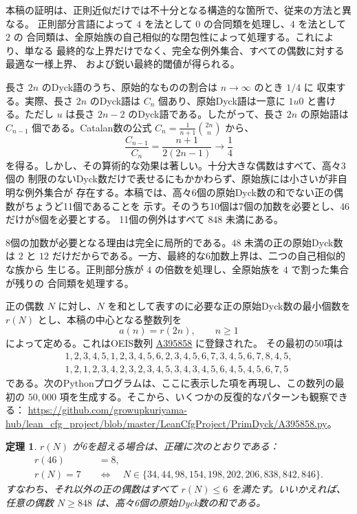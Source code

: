 \documentclass[12pt]{ltjsarticle}
\theoremstyle{plain}
\newtheorem{theorem}{定理}
\newcommand{\seqnum}[1]{\href{https://oeis.org/#1}{\rm \underline{#1}}}
\begin{document}
本稿の証明は、正則近似だけでは不十分となる構造的な箇所で、従来の方法と異なる。
正則部分言語によって $4$ を法として $0$ の合同類を処理し、$4$ を法として $2$ の
合同類は、全原始族の自己相似的な閉包性によって処理する。これにより、単なる
最終的な上界だけでなく、完全な例外集合、すべての偶数に対する最適な一様上界、
および鋭い最終的閾値が得られる。

長さ $2n$ のDyck語のうち、原始的なものの割合は $n\to\infty$ のとき $1/4$ に
収束する。実際、長さ $2n$ のDyck語は $C_n$ 個あり、原始Dyck語は一意に
$1u0$ と書ける。ただし $u$ は長さ $2n-2$ のDyck語である。したがって、長さ
$2n$ の原始語は $C_{n-1}$ 個である。Catalan数の公式
$C_n=\frac1{n+1}\binom{2n}{n}$ から、
\[
 \frac{C_{n-1}}{C_n}=\frac{n+1}{2(2n-1)}\longrightarrow\frac14
\]
を得る。しかし、その算術的な効果は著しい。十分大きな偶数はすべて、高々3個の
制限のないDyck数だけで表せるにもかかわらず、原始族には小さいが非自明な例外集合が
存在する。本稿では、高々6個の原始Dyck数の和でない正の偶数がちょうど11個であることを
示す。そのうち10個は7個の加数を必要とし、$46$だけが8個を必要とする。
11個の例外はすべて $848$ 未満にある。

8個の加数が必要となる理由は完全に局所的である。$48$ 未満の正の原始Dyck数は
$2$ と $12$ だけだからである。一方、最終的な6加数上界は、二つの自己相似的な族から
生じる。正則部分族が $4$ の倍数を処理し、全原始族を $4$ で割った集合が残りの
合同類を処理する。

正の偶数 $N$ に対し、$N$ を和として表すのに必要な正の原始Dyck数の最小個数を
$r(N)$ とし、本稿の中心となる整数列を
\[
        a(n)=r(2n),\qquad n\geq1
\]
によって定める。これはOEIS数列 \seqnum{A395858} \cite{OEIS-A395858} に登録された。
その最初の50項は
\[
\begin{gathered}
1,2,3,4,5,1,2,3,4,5,6,2,3,4,5,6,7,3,4,5,6,7,8,4,5,\\
1,2,1,2,3,4,2,3,2,3,4,5,3,4,3,4,5,6,4,5,4,5,6,7,5
\end{gathered}
\]
である。次のPythonプログラムは、ここに表示した項を再現し、この数列の最初の
$50{,}000$ 項を生成する。そこから、いくつかの反復的なパターンも観察できる：
\url{https://github.com/growupkuriyama-hub/lean_cfg_project/blob/master/LeanCfgProject/PrimDyck/A395858.py}。

\begin{theorem}\label{thm:main}
$r(N)$ が6を超える場合は、正確に次のとおりである：
\[
\begin{aligned}
r(46) &= 8, \\[4pt]
r(N) = 7 \quad&\Longleftrightarrow\quad
 N\in\{34,44,98,154,198,202,206,838,842,846\}.
\end{aligned}
\]
すなわち、それ以外の正の偶数はすべて $r(N)\leq6$ を満たす。いいかえれば、任意の偶数
$N\geq848$ は、高々6個の原始Dyck数の和である。
\end{theorem}
\end{document}
